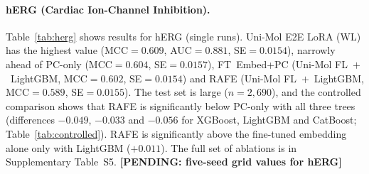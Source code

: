 \documentclass[pdflatex,sn-mathphys-num]{sn-jnl}%
\newcommand{\pending}[1]{{\color{red}\textbf{[PENDING: #1]}}}%
\begin{document}
\paragraph{hERG (Cardiac Ion-Channel Inhibition).} Table~\ref{tab:herg} shows results for hERG (single runs). Uni-Mol E2E LoRA (WL) has the highest value (MCC$=0.609$, AUC$=0.881$, SE$=0.0154$), narrowly ahead of PC-only (MCC$=0.604$, SE$=0.0157$), FT~Embed+PC (Uni-Mol FL~$+$~LightGBM, MCC$=0.602$, SE$=0.0154$) and RAFE (Uni-Mol FL~$+$~LightGBM, MCC$=0.589$, SE$=0.0155$). The test set is large ($n=2{,}690$), and the controlled comparison shows that RAFE is significantly below PC-only with all three trees (differences $-0.049$, $-0.033$ and $-0.056$ for XGBoost, LightGBM and CatBoost; Table~\ref{tab:controlled}). RAFE is significantly above the fine-tuned embedding alone only with LightGBM ($+0.011$). The full set of ablations is in Supplementary Table~S5. \pending{five-seed grid values for hERG}

\begin{table}[!ht]
\centering
\caption{Best configurations on hERG (binary, cardiac ion-channel inhibition).}
\label{tab:herg}
\end{table}
\end{document}
